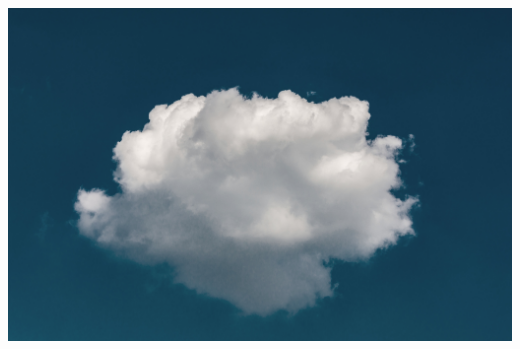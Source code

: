 \pagestyle{empty}




    \thispagestyle{empty}

    \pagecolor{frontpage}\afterpage{\nopagecolor}

    \begin{minipage}[t][0.8\paperheight]{0.8\paperwidth}
        \begin{center}

                  {\color{white} \fontsize{52}{104}\selectfont \textbf{\theTitle} }

                  \vspace{0.2\paperheight}


                  \includegraphics[width=0.75\paperwidth]{fig/cloud}

                  \vspace{0.2\paperheight}

                 {\color{white} \fontsize{24}{48}\selectfont \textbf{\theAuthor} }
        \end{center}
    \end{minipage}

